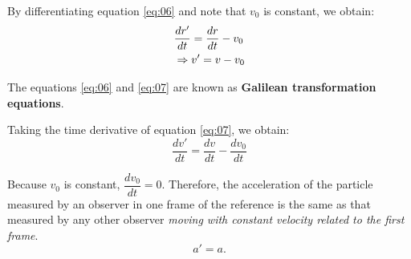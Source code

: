         \par By differentiating equation \eqref{eq:06} and note that $v_{0}$ is constant, we obtain:
        \begin{equation}
        \label{eq:07}
            \begin{aligned}
                & \frac{dr'}{dt} = \frac{dr}{dt} - v_{0} \\
                & \Rightarrow v' = v - v_{0}
            \end{aligned}
        \end{equation}

        \par The equations \eqref{eq:06} and \eqref{eq:07} are known as \textbf{Galilean
        transformation equations}.

        \par Taking the time derivative of equation \eqref{eq:07}, we obtain:
        \begin{equation}
            \frac{dv'}{dt} = \frac{dv}{dt} - \frac{dv_{0}}{dt}
        \end{equation}
        \par Because $v_{0}$ is constant, $\dfrac{dv_{0}}{dt} = 0$. Therefore, the acceleration of
        the particle measured by an observer in one frame of the reference is the same as
        that measured by any other observer \textit{moving with constant velocity related to
        the first frame}.
        \begin{equation}
            a' = a.
        \end{equation}

    \pagebreak
